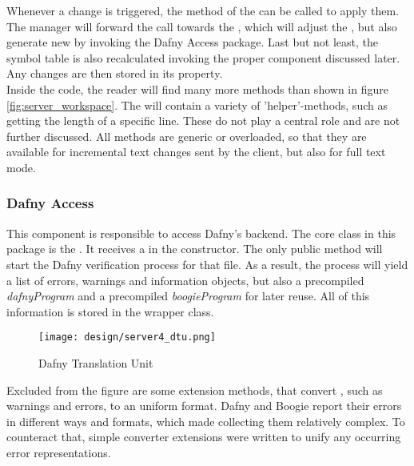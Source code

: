 Whenever a change is triggered, the  method of the  can be called to apply them.
The manager will forward the call towards the , which will adjust the ,
but also generate new  by invoking the Dafny Access package.
Last but not least, the symbol table is also recalculated invoking the proper component discussed later.
Any changes are then stored in its  property.\\

Inside the code, the reader will find many more methods than shown in figure \ref{fig:server_workspace}.
The  will contain a variety of 'helper'-methods, such as getting the length of a specific line.
These do not play a central role and are not further discussed.
All  methods are generic or overloaded, so that they are available for incremental text changes sent by the client, but also for full text mode.

\subsubsection{Dafny Access}
This component is responsible to access Dafny's backend.
The core class in this package is the \linebreak {}.
It receives a  in the constructor.
The only public method  will start the Dafny verification process for that file.
As a result, the process will yield a list of errors, warnings and information objects, but also a precompiled \textit{dafnyProgram} and a precompiled \textit{boogieProgram} for later reuse.
All of this information is stored in the  wrapper class.\\

\begin{figure}[H]
    \centering
    \texttt{[image: design/server4\_dtu.png]}
    \caption{Dafny Translation Unit}
    \label{fig:server_dtu}
\end{figure}


Excluded from the figure are some extension methods, that convert , such as warnings and errors, to an uniform format.
Dafny and Boogie report their errors in different ways and formats, which made collecting them relatively complex.
To counteract that, simple converter extensions were written to unify any occurring error representations.

